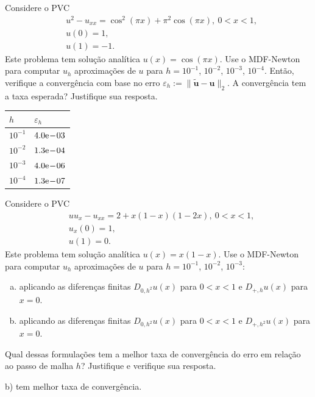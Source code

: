 \begin{exer}
  Considere o PVC
  \begin{subequations}
    \begin{align}
      &u^2 - u_{xx} = \cos^2(\pi x) + \pi^2\cos(\pi x), ~0 < x < 1,\\
      &u(0) = 1,\\
      &u(1) = -1.
    \end{align}
  \end{subequations}
  Este problema tem solução analítica $u(x) = \cos(\pi x)$. Use o MDF-Newton para computar $u_h$ aproximações de $u$ para $h = 10^{-1}$, $10^{-2}$, $10^{-3}$, $10^{-4}$. Então, verifique a convergência com base no erro $\varepsilon_h := \|\tilde{\pmb{u}} - \pmb{u}\|_2$. A convergência tem a taxa esperada? Justifique sua resposta.
\end{exer}
\begin{resp}
  \begin{center}
    \begin{tabular}{ll}\toprule
      $h$ & $\varepsilon_h$ \\\midrule
      $10^{-1}$ & $4.0\mathrm{e}\!-\!03$\\
      $10^{-2}$ & $1.3\mathrm{e}\!-\!04$\\
      $10^{-3}$ & $4.0\mathrm{e}\!-\!06$\\
      $10^{-4}$ & $1.3\mathrm{e}\!-\!07$\\\bottomrule
    \end{tabular}
  \end{center}
\end{resp}

\begin{exer}\label{cap_pvc_sec_pnlin:exer:mdf-newton}
  Considere o PVC
  \begin{subequations}
    \begin{align}
      &uu_x - u_{xx} = 2 + x(1-x)(1-2x), ~0 < x < 1,\\
      &u_x(0) = 1,\\
      &u(1) = 0.
    \end{align}
  \end{subequations}
  Este problema tem solução analítica $u(x) = x(1-x)$. Use o MDF-Newton para computar $u_h$ aproximações de $u$ para $h = 10^{-1}$, $10^{-2}$, $10^{-3}$:
  \begin{enumerate}[a)]
  \item aplicando as diferenças finitas $D_{0,h^2}u(x)$ para $0 < x < 1$ e $D_{+,h}u(x)$ para $x=0$.
  \item aplicando as diferenças finitas $D_{0,h^2}u(x)$ para $0 < x < 1$ e $D_{+,h^2}u(x)$ para $x=0$.
  \end{enumerate}
  Qual dessas formulações tem a melhor taxa de convergência do erro em relação ao passo de malha $h$? Justifique e verifique sua resposta.
\end{exer}
\begin{resp}
  b) tem melhor taxa de convergência.
\end{resp}

